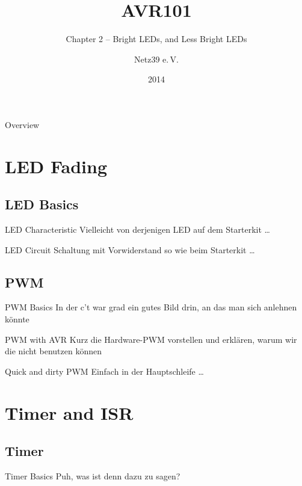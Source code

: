 \documentclass{beamer}
\title{AVR101}
\subtitle{Chapter 2 -- Bright LEDs, and Less Bright LEDs}
\author{Netz39 e.\,V.}
\institute{\url{http://www.netz39.de/}}
\date{2014}
\begin{document}
\begin{frame}
	\titlepage
\end{frame}

\begin{frame}{Overview}
    \tableofcontents
\end{frame}

\section{LED Fading}

\subsection{LED Basics}

\begin{frame}{LED Characteristic}
    Vielleicht von derjenigen LED auf dem Starterkit …
\end{frame}

\begin{frame}{LED Circuit}
    Schaltung mit Vorwiderstand so wie beim Starterkit …
\end{frame}

\subsection{PWM}

\begin{frame}{PWM Basics}
    In der c't war grad ein gutes Bild drin, an das man sich anlehnen könnte
\end{frame}

\begin{frame}{PWM with AVR}
    Kurz die Hardware-PWM vorstellen und erklären, warum wir die nicht benutzen können
\end{frame}

\begin{frame}{Quick and dirty PWM}
    Einfach in der Hauptschleife …
\end{frame}

\section{Timer and ISR}

\subsection{Timer}

\begin{frame}{Timer Basics}
    Puh, was ist denn dazu zu sagen?
\end{frame}
\end{document}
